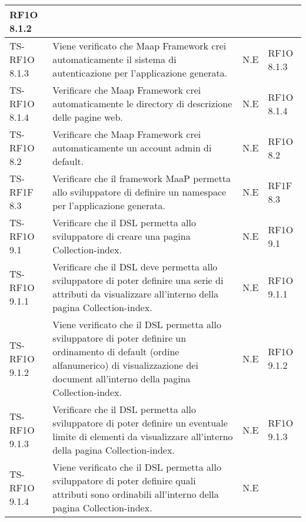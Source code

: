 \begin{center}
\begin{longtable}{| p{3cm} | p{6cm} | p{1.5cm} | p{2cm} | }
            RF1O 8.1.2 \newline  \\ \hline 
        TS-RF1O 8.1.3 & 
        Viene verificato che Maap Framework crei automaticamente il sistema di autenticazione per l’applicazione generata. & N.E &       
            RF1O 8.1.3 \newline  \\ \hline 
        TS-RF1O 8.1.4 & 
        Verificare che Maap Framework crei automaticamente le directory di descrizione delle pagine web. & N.E &       
            RF1O 8.1.4 \newline  \\ \hline 
        TS-RF1O 8.2 & 
        Verificare che Maap Framework crei automaticamente un account admin di default. & N.E &       
            RF1O 8.2 \newline  \\ \hline 
        TS-RF1F 8.3 & 
        Verificare che il framework MaaP permetta allo sviluppatore di definire un namespace per l’applicazione generata. & N.E &       
            RF1F 8.3 \newline  \\ \hline 
        TS-RF1O 9.1 & 
        Verificare che il DSL permetta allo sviluppatore di creare una pagina Collection-index. & N.E &       
            RF1O 9.1 \newline  \\ \hline 
        TS-RF1O 9.1.1 & 
        Verificare che il DSL deve permetta allo sviluppatore di poter definire una serie di attributi da visualizzare all’interno della pagina Collection-index. & N.E &       
            RF1O 9.1.1 \newline  \\ \hline 
        TS-RF1O 9.1.2 & 
        Viene verificato che il DSL permetta allo sviluppatore di poter definire un ordinamento di default (ordine alfanumerico) di visualizzazione dei document all'interno della pagina Collection-index. & N.E &       
            RF1O 9.1.2 \newline  \\ \hline 
        TS-RF1O 9.1.3 & 
        Verificare che il DSL permetta allo sviluppatore di poter definire un eventuale limite di elementi da visualizzare all’interno della pagina Collection-index. & N.E &       
            RF1O 9.1.3 \newline  \\ \hline 
        TS-RF1O 9.1.4 & 
        Viene verificato che il DSL permetta allo sviluppatore di poter definire quali attributi sono ordinabili all’interno della pagina Collection-index. & N.E &       

\end{longtable}
\end{center}
